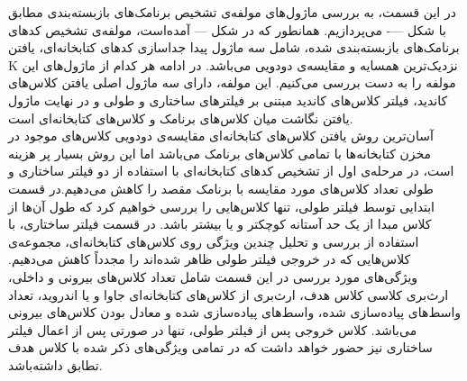 در این قسمت، به بررسی ماژول‌های مولفه‌ی تشخیص‌ برنامک‌های بازبسته‌بندی مطابق با شکل ---- می‌پردازیم.
همانطور که در شکل --- آمده‌است، مولفه‌ی تشخیص کد‌های برنامک‌‌های بازبسته‌بندی شده، شامل سه ماژول پیدا جداسازی کد‌های کتابخانه‌ای، یافتن K نزدیک‌ترین همسایه و مقایسه‌ی دودویی می‌باشد. در ادامه هر کدام از ماژول‌های این مولفه‌ را به دست بررسی می‌کنیم. 
این مولفه‌، دارای سه ماژول اصلی یافتن کلاس‌های کاندید، فیلتر کلاس‌های کاندید مبتنی بر فیلتر‌های ساختاری و طولی و در نهایت ماژول یافتن نگاشت میان کلاس‌های برنامک و کلاس‌های کتابخانه‌ای است.\\
آسان‌ترین روش یافتن کلاس‌های کتابخانه‌ای مقایسه‌ی دودویی کلاس‌های موجود در مخزن کتابخانه‌ها با تمامی کلاس‌های برنامک می‌باشد اما این روش بسیار پر هزینه‌ است، در مرحله‌ی اول از تشخیص کد‌های کتابخانه‌ای با استفاده از دو فیلتر ساختاری و طولی تعداد کلاس‌های مورد مقایسه با برنامک مقصد را کاهش می‌دهیم.در قسمت ابتدایی توسط فیلتر طولی، تنها کلاس‌هایی را بررسی خواهیم کرد که طول آن‌ها از کلاس مبدا از یک حد آستانه کوچکتر و یا بیشتر باشد. در قسمت فیلتر ساختاری، با استفاده از بررسی و تحلیل چندین ویژگی روی کلاس‌های کتابخانه‌ای، مجموعه‌ی کلاس‌هایی که در خروجی فیلتر طولی ظاهر شده‌اند را مجدداً کاهش می‌دهیم. ویژگی‌های مورد بررسی در این قسمت شامل تعداد کلاس‌های بیرونی و داخلی، ارث‌بری کلاسی کلاس هدف، ارث‌بری از کلاس‌های کتابخانه‌ای جاوا و یا اندروید، تعداد واسط‌های پیاده‌سازی شده، واسط‌‌های پیاده‌سازی شده و معادل بودن کلاس‌های بیرونی می‌باشد. کلاس خروجی پس از فیلتر طولی، تنها در صورتی پس از اعمال فیلتر ساختاری نیز حضور خواهد داشت که در تمامی ویژگی‌های ذکر شده با کلاس هدف تطابق داشته‌باشد.\\ 
